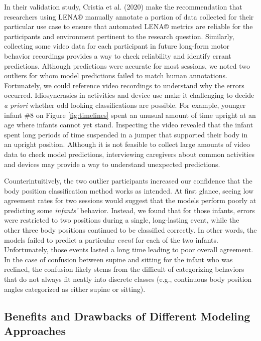 \documentclass[
  man]{apa6}
\begin{document}
In their validation study, Cristia et al. (2020) make the recommendation that researchers using LENA® manually annotate a portion of data collected for their particular use case to ensure that automated LENA® metrics are reliable for the participants and environment pertinent to the research question. Similarly, collecting some video data for each participant in future long-form motor behavior recordings provides a way to check reliability and identify errant predictions. Although predictions were accurate for most sessions, we noted two outliers for whom model predictions failed to match human annotations. Fortunately, we could reference video recordings to understand why the errors occurred. Idiosyncrasies in activities and device use make it challenging to decide \emph{a priori} whether odd looking classifications are possible. For example, younger infant \#8 on Figure \ref{fig:timelines} spent an unusual amount of time upright at an age where infants cannot yet stand. Inspecting the video revealed that the infant spent long periods of time suspended in a jumper that supported their body in an upright position. Although it is not feasible to collect large amounts of video data to check model predictions, interviewing caregivers about common activities and devices may provide a way to understand unexpected predictions.

Counterintuitively, the two outlier participants increased our confidence that the body position classification method works as intended. At first glance, seeing low agreement rates for two sessions would suggest that the models perform poorly at predicting some \emph{infants'} behavior. Instead, we found that for those infants, errors were restricted to two positions during a single, long-lasting event, while the other three body positions continued to be classified correctly. In other words, the models failed to predict a particular \emph{event} for each of the two infants. Unfortunately, those events lasted a long time leading to poor overall agreement. In the case of confusion between supine and sitting for the infant who was reclined, the confusion likely stems from the difficult of categorizing behaviors that do not always fit neatly into discrete classes (e.g., continuous body position angles categorized as either supine or sitting).

\hypertarget{benefits-and-drawbacks-of-different-modeling-approaches}{%
\subsection{Benefits and Drawbacks of Different Modeling Approaches}\label{benefits-and-drawbacks-of-different-modeling-approaches}}
\end{document}
